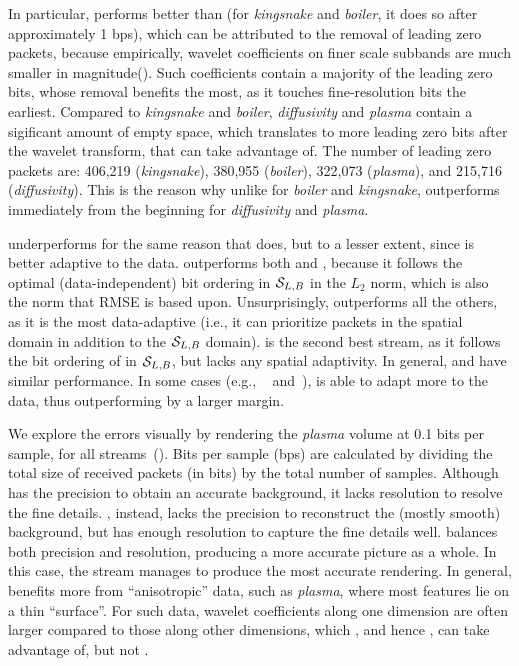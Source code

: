 In particular, \sbit performs better than \slvl (for \emph{kingsnake} and \emph{boiler}, it does so
after approximately 1 bps), which can be attributed to the removal of leading zero packets, because
empirically, wavelet coefficients on finer scale subbands are much smaller in magnitude().
Such coefficients contain a majority of the leading zero bits, whose removal benefits \sbit the
most, as it touches fine-resolution bits the earliest. Compared to \emph{kingsnake} and
\emph{boiler}, \emph{diffusivity} and \emph{plasma} contain a sigificant amount of empty space,
which translates to more leading zero bits after the wavelet transform, that \sbit can take
advantage of. The number of leading zero packets are: 406,219 (\emph{kingsnake}), 380,955
(\emph{boiler}), 322,073 (\emph{plasma}), and 215,716 (\emph{diffusivity}). This is the reason why
unlike for \emph{boiler} and \emph{kingsnake}, \sbit outperforms \slvl immediately from the
beginning for \emph{diffusivity} and \emph{plasma}. 

\smag underperforms for the same reason that \slvl does, but to a lesser extent, since \smag is
better adaptive to the data. \swav outperforms both \slvl and \sbit, because it follows the optimal
(data-independent) bit ordering in $\strm_{L,B}$ in the $L_2$ norm, which is also the norm that RMSE
is based upon. Unsurprisingly, \sopt outperforms all the others, as it is the most data-adaptive
(i.e., it can prioritize packets in the spatial domain in addition to the $\strm_{L,B}$ domain).
\ssig is the second best stream, as it follows the bit ordering of \sopt in $\strm_{L,B}$, but lacks
any spatial adaptivity. In general, \swav and \ssig have similar performance. In some cases (e.g.,
~ and~), \ssig is able to adapt more to the data,
thus outperforming \swav by a larger margin.

We explore the errors visually by rendering the \emph{plasma} volume at 0.1 bits per sample, 
for all streams~(). Bits per sample (bps) are calculated by
dividing the total size of received packets (in bits) by the total number of samples.  
Although \slvl
has the precision to obtain an accurate background, it lacks resolution to resolve the fine details.
\sbit, instead, lacks the precision to reconstruct the (mostly smooth) background, but has enough
resolution to capture the fine details well. \swav balances both precision and resolution, producing
a more accurate picture as a whole. In this case, the \ssig stream manages to produce the most
accurate rendering. In general, \ssig benefits more from ``anisotropic'' data, such as
\emph{plasma}, where most features lie on a thin ``surface''. For such data, wavelet coefficients
along one dimension are often larger compared to those along other dimensions, which \sopt, and
hence \ssig, can take advantage of, but not \swav.
